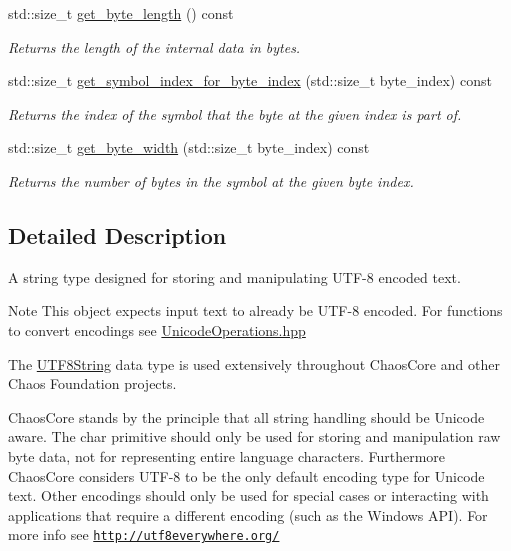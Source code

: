 \begin{DoxyCompactItemize}
std\+::size\+\_\+t \hyperlink{classchaos_1_1uni_1_1_u_t_f8_string_a608a9a344875410a9b6e50d9ee0dbb65}{get\+\_\+byte\+\_\+length} () const 
\begin{DoxyCompactList}\small\item\em Returns the length of the internal data in bytes. \end{DoxyCompactList}\item 
std\+::size\+\_\+t \hyperlink{classchaos_1_1uni_1_1_u_t_f8_string_a89e9a1230821381e1d6d09099c119693}{get\+\_\+symbol\+\_\+index\+\_\+for\+\_\+byte\+\_\+index} (std\+::size\+\_\+t byte\+\_\+index) const 
\begin{DoxyCompactList}\small\item\em Returns the index of the symbol that the byte at the given index is part of. \end{DoxyCompactList}\item 
std\+::size\+\_\+t \hyperlink{classchaos_1_1uni_1_1_u_t_f8_string_ae0865f2a2dc39b4a9c3a7c968123f8fe}{get\+\_\+byte\+\_\+width} (std\+::size\+\_\+t byte\+\_\+index) const 
\begin{DoxyCompactList}\small\item\em Returns the number of bytes in the symbol at the given byte index. \end{DoxyCompactList}\end{DoxyCompactItemize}


\subsection{Detailed Description}
A string type designed for storing and manipulating U\+T\+F-\/8 encoded text. 

\begin{DoxyNote}{Note}
This object expects input text to already be U\+T\+F-\/8 encoded. For functions to convert encodings see \hyperlink{_unicode_operations_8hpp}{Unicode\+Operations.\+hpp}
\end{DoxyNote}
The \hyperlink{classchaos_1_1uni_1_1_u_t_f8_string}{U\+T\+F8\+String} data type is used extensively throughout Chaos\+Core and other Chaos Foundation projects.

Chaos\+Core stands by the principle that all string handling should be Unicode aware. The {\ttfamily char} primitive should only be used for storing and manipulation raw byte data, not for representing entire language characters. Furthermore Chaos\+Core considers U\+T\+F-\/8 to be the only default encoding type for Unicode text. Other encodings should only be used for special cases or interacting with applications that require a different encoding (such as the Windows A\+P\+I). For more info see \href{http://utf8everywhere.org/}{\tt http\+://utf8everywhere.\+org/}

